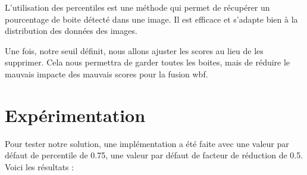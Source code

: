 \documentclass{article}
\begin{document}
L'utilisation des percentiles est une méthode qui permet de récupérer un pourcentage de boite détecté dans une image. Il est efficace et s'adapte bien à la distribution des données des images. 

Une fois, notre seuil définit, nous allons ajuster les scores au lieu de les supprimer. Cela nous permettra de garder toutes les boites, mais de réduire le mauvais impacte des mauvais scores pour la fusion wbf. 
\newpage

\section{Expérimentation}
Pour tester notre solution, une implémentation a été faite avec une valeur par défaut de percentile de 0.75, une valeur par défaut de facteur de réduction de 0.5. Voici les résultats : 
\end{document}
